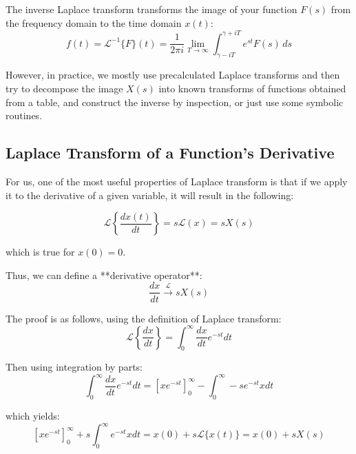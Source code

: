 The inverse Laplace transform transforms the image of your function \(F(s)\) from the frequency domain to the time domain \(x(t)\):
\begin{equation}
    f(t) = {\mathcal {L}}^{-1}\{F\}(t) = {\frac {1}{2\pi i}}\lim _{T\to \infty }\int _{\gamma -iT}^{\gamma +iT}e^{st}F(s)\,ds
\end{equation}

However, in practice, we mostly use precalculated Laplace transforms and then try to decompose the image \(X(s)\) into known transforms of functions obtained from a table, and construct the inverse by inspection, or just use some symbolic routines.

\subsection{Laplace Transform of a Function's Derivative}

For us, one of the most useful properties of Laplace transform is that if we apply it to the derivative of a given variable, it will result in the following:

\begin{equation}
    \mathcal{L}\left\{\frac{dx(t)}{dt}\right\} = s \mathcal{L}\left(x\right) = s X(s)
\end{equation}

which is true for \(x(0) = 0\).

Thus, we can define a **derivative operator**:
\begin{equation}
    \frac{dx}{dt} \xrightarrow{\mathcal{L}} s X(s)
\end{equation}

The proof is as follows, using the definition of Laplace transform:
\begin{equation}
    \mathcal{L}\left\{\frac{dx}{dt}\right\} = \int_0^\infty \frac{dx}{dt} e^{-st}dt
\end{equation}

Then using integration by parts:
\begin{equation}
    \int_0^\infty \frac{dx}{dt} e^{-st}dt =  \left[x e^{-st} \right]_0^\infty - \int_0^\infty -se^{-st} x dt
\end{equation}

which yields:
\begin{equation}
    \left[x e^{-st} \right]_0^\infty + s\int_0^\infty e^{-st} x dt = x(0) + s\mathcal{L}\{x(t)\} = x(0) + sX(s)
\end{equation}

